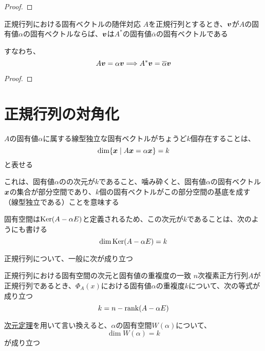 \documentclass[../../../topic_linear-algebra]{subfiles}
\begin{document}
\begin{proof}
\end{proof}

\br

\begin{theorem}{正規行列における固有ベクトルの随伴対応}
  $A$を正規行列とするとき、$\vb*{v}$が$A$の固有値$\alpha$の固有ベクトルならば、$\vb*{v}$は$A^*$の固有値$\overline{\alpha}$の固有ベクトルである

  すなわち、
  \begin{equation*}
    A\vb*{v} = \alpha \vb*{v} \Longrightarrow A^*\vb*{v} = \overline{\alpha} \vb*{v}
  \end{equation*}
\end{theorem}

\begin{proof}
\end{proof}

\sectionline
\section{正規行列の対角化}

$A$の固有値$\alpha$に属する線型独立な固有ベクトルがちょうど$k$個存在することは、
\begin{equation*}
  \dim \{\vb*{x} \mid A\vb*{x} = \alpha \vb*{x} \} = k
\end{equation*}
と表せる

これは、固有値$\alpha$のの次元が$k$であること、噛み砕くと、固有値$\alpha$の固有ベクトル$\vb*{x}$の集合が部分空間であり、$k$個の固有ベクトルがこの部分空間の基底を成す（線型独立である）ことを意味する

\br

固有空間は$\operatorname{Ker}(A - \alpha E)$と定義されるため、この次元が$k$であることは、次のようにも書ける
\begin{equation*}
  \dim \operatorname{Ker}(A - \alpha E) = k
\end{equation*}

\br

正規行列について、一般に次が成り立つ

\begin{theorem}{正規行列における固有空間の次元と固有値の重複度の一致}\label{thm:normal-matrix-eigenvalue-multiplicity}
  $n$次複素正方行列$A$が正規行列であるとき、$\Phi_A(x)$における固有値$\alpha$の重複度$k$について、次の等式が成り立つ
  \begin{equation*}
    k = n - \rank(A - \alpha E)
  \end{equation*}

  \hyperref[thm:rank-nullity-theorem]{次元定理}を用いて言い換えると、$\alpha$の固有空間$W(\alpha)$について、
  \begin{equation*}
    \dim W(\alpha) = k
  \end{equation*}
  が成り立つ
\end{theorem}
\end{document}
